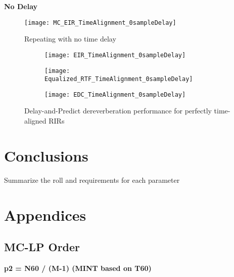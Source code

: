 \textbf{No Delay}

\begin{figure}[H]
	\texttt{[image: MC\_EIR\_TimeAlignment\_0sampleDelay]}
	\centering
	\caption{Repeating with no time delay}
	\label{fig:params_MC_EIR_TimeAlignment_0sampleDelay}
\end{figure}

\begin{figure}[H]
	\centering
	\begin{subfigure}[b]{0.32\textwidth}
		\centering
		\texttt{[image: EIR\_TimeAlignment\_0sampleDelay]}
	\end{subfigure}
	\hfill
	\begin{subfigure}[b]{0.32\textwidth}
		\centering
		\texttt{[image: Equalized\_RTF\_TimeAlignment\_0sampleDelay]}
	\end{subfigure}
	\hfill
	\begin{subfigure}[b]{0.32\textwidth}
		\centering
		\texttt{[image: EDC\_TimeAlignment\_0sampleDelay]}
	\end{subfigure}
	\hfill
	\caption{Delay-and-Predict dereverberation performance for perfectly time-aligned RIRs}
	\label{fig:params_TimeAlignment_0sampleDelay}
\end{figure}






\section{Conclusions}

Summarize the roll and requirements for each parameter



\section{Appendices}

\subsection{MC-LP Order}

\textbf{p2 = N60 / (M-1)  (MINT based on T60)}

